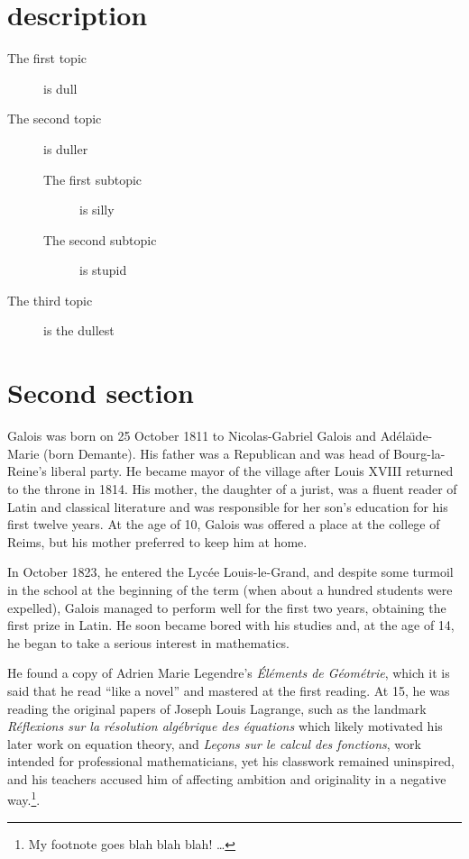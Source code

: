 \section*{description}
\begin{description}
\item[The first topic] is dull
\item[The second topic] is duller
\begin{description}
\item[The first subtopic] is silly
\item[The second subtopic] is stupid
\end{description}
\item[The third topic] is the dullest
\end{description}

\section{Second section}
Galois was born on 25 October 1811 to Nicolas-Gabriel Galois and Ad\'{e}la\"{\i}de-Marie (born Demante). His father was a Republican and was head of Bourg-la-Reine's liberal party. He became mayor of the village after Louis XVIII returned to the throne in 1814. His mother, the daughter of a jurist, was a fluent reader of Latin and classical literature and was responsible for her son's education for his first twelve years. At the age of 10, Galois was offered a place at the college of Reims, but his mother preferred to keep him at home.

In October 1823, he entered the Lyc\'{e}e Louis-le-Grand, and despite some turmoil in the school at the beginning of the term (when about a hundred students were expelled), Galois managed to perform well for the first two years, obtaining the first prize in Latin. He soon became bored with his studies and, at the age of 14, he began to take a serious interest in mathematics.

He found a copy of Adrien Marie Legendre's {\it \'{E}l\'{e}ments de G\'{e}om\'{e}trie}, which it is said that he read ``like a novel'' and mastered at the first reading. At 15, he was reading the original papers of Joseph Louis Lagrange, such as the landmark {\it R\'{e}flexions sur la r\'{e}solution alg\'{e}brique des \'{e}quations} which likely motivated his later work on equation theory, and {\it Le\c{c}ons sur le calcul des fonctions}, work intended for professional mathematicians, yet his classwork remained uninspired, and his teachers accused him of affecting ambition and originality in a negative way.\footnote{My footnote goes blah blah blah! \dots}.

